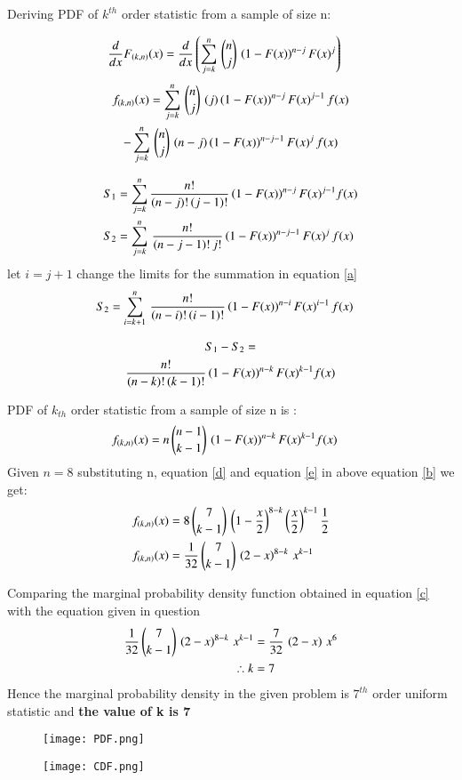 \documentclass[journal,12pt,twocolumn]{IEEEtran}
\begin{document}
Deriving PDF of $k^{th}$ order statistic from a sample of size n:
 
 \begin{align}
\nonumber \dfrac{d}{dx} F_{(k,n)}(x) &= \dfrac{d}{dx}\left(\displaystyle\sum_{j=k}^{n}\,{n \choose j}\,\left(1-F(x)\right)^{n-j} F(x)^{j}\right) 
 \end{align}
\begin{multline}
\nonumber f_{(k,n)}(x) = \displaystyle\sum_{j=k}^{n}\,{n \choose j}\,\left(j\right)\left(1-F(x)\right)^{n-j}F(x)^{j-1}\,f(x)  \\
                -\displaystyle\sum_{j=k}^{n}\,{n \choose j}\,\left(n-j\right)\left(1-F(x)\right)^{n-j-1}F(x)^{j}\,f(x) 
\end{multline}

\begin{align}
S_1  &= \displaystyle\sum_{j=k}^{n} \dfrac{n!}{(n-j)!\,(j-1)!}\left(1-F(x)\right)^{n-j}F(x)^{j-1} f(x) \\
S_2  &= \displaystyle\sum_{j=k}^{n}\,\dfrac{n!}{(n-j-1)!\,j!}\left(1-F(x)\right)^{n-j-1}F(x)^{j}\,f(x) \label{a}
\end{align}
let $i = j+1$ change the limits for the summation in equation \eqref{a}
\begin{align}
\nonumber S_2  &= \displaystyle\sum_{i=k+1}^{n}\,\dfrac{n!}{(n-i)!\,(i-1)!}\left(1-F(x)\right)^{n-i}F(x)^{i-1}\,f(x)  
\end{align}

\begin{multline}
S_1 - S_2  =  \\
           \dfrac{n!}{(n-k)!\,(k-1)!}\left(1-F(x)\right)^{n-k}F(x)^{k-1} f(x) 
\end{multline}

 \newpage
 
 PDF of $k_{th}$ order statistic from a sample of size n is :
\begin{align}
f_{(k,n)}(x) &= n\,{n-1 \choose k-1}\,\left(1-F(x)\right)^{n-k}F(x)^{k-1} f(x) \label{b}
\end{align}
Given $n=8$ substituting n, equation \eqref{d} and equation \eqref{e}  in above equation \eqref{b} we get:
\begin{align}
\nonumber f_{(k,n)}(x) &= 8\,{7 \choose k-1}\,\left(1-\dfrac{x}{2}\right)^{8-k}\left(\dfrac{x}{2}\right)^{k-1} \dfrac{1}{2} \\
f_{(k,n)}(x) &= \dfrac{1}{32}\,{7 \choose k-1}\,\left(2-x\right)^{8-k}\,x^{k-1} \label{c} 
\end{align}

Comparing the marginal probability density function obtained in equation \eqref{c} with the equation given in question
\begin{align}
\nonumber \dfrac{1}{32}\,{7 \choose k-1}\,\left(2-x\right)^{8-k}\,x^{k-1} &= \dfrac{7}{32}\,\left(2-x\right)\,x^6 \\
\therefore k &= 7 
\end{align}
Hence the marginal probability density in the given problem is $7^{th}$ order uniform statistic and \textbf{the value of k is 7}

\newpage

\begin{figure}[htp]
    \centering
    \texttt{[image: PDF.png]}
    \label{fig:PDF  of X}
\end{figure}

\begin{figure}[htp]
    \centering
    \texttt{[image: CDF.png]}
    \label{fig:CDF of X}
\end{figure}
\end{document}
